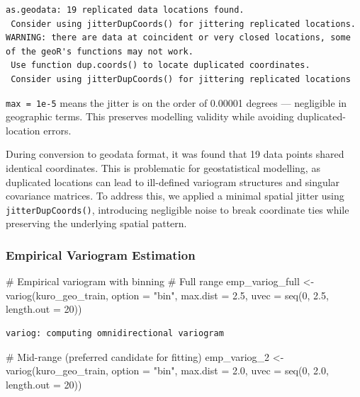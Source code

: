 \documentclass[
  11pt,
]{article}
\newenvironment{Shaded}{\begin{snugshade}}{\end{snugshade}}
\newcommand{\AttributeTok}[1]{\textcolor[rgb]{0.40,0.45,0.13}{#1}}
\newcommand{\CommentTok}[1]{\textcolor[rgb]{0.37,0.37,0.37}{#1}}
\newcommand{\DecValTok}[1]{\textcolor[rgb]{0.68,0.00,0.00}{#1}}
\newcommand{\FloatTok}[1]{\textcolor[rgb]{0.68,0.00,0.00}{#1}}
\newcommand{\FunctionTok}[1]{\textcolor[rgb]{0.28,0.35,0.67}{#1}}
\newcommand{\NormalTok}[1]{\textcolor[rgb]{0.00,0.23,0.31}{#1}}
\newcommand{\OtherTok}[1]{\textcolor[rgb]{0.00,0.23,0.31}{#1}}
\newcommand{\StringTok}[1]{\textcolor[rgb]{0.13,0.47,0.30}{#1}}
\begin{document}
\begin{verbatim}
as.geodata: 19 replicated data locations found. 
 Consider using jitterDupCoords() for jittering replicated locations. 
WARNING: there are data at coincident or very closed locations, some of the geoR's functions may not work.
 Use function dup.coords() to locate duplicated coordinates.
 Consider using jitterDupCoords() for jittering replicated locations 
\end{verbatim}

\texttt{max\ =\ 1e-5} means the jitter is on the order of 0.00001
degrees --- negligible in geographic terms. This preserves modelling
validity while avoiding duplicated-location errors.

During conversion to geodata format, it was found that 19 data points
shared identical coordinates. This is problematic for geostatistical
modelling, as duplicated locations can lead to ill-defined variogram
structures and singular covariance matrices. To address this, we applied
a minimal spatial jitter using \texttt{jitterDupCoords()}, introducing
negligible noise to break coordinate ties while preserving the
underlying spatial pattern.

\subsubsection{Empirical Variogram
Estimation}\label{empirical-variogram-estimation}

\begin{Shaded}
\begin{Highlighting}[]
\CommentTok{\# Empirical variogram with binning}
\CommentTok{\# Full range}
\NormalTok{emp\_variog\_full }\OtherTok{\textless{}{-}} \FunctionTok{variog}\NormalTok{(kuro\_geo\_train, }\AttributeTok{option =} \StringTok{"bin"}\NormalTok{, }\AttributeTok{max.dist =} \FloatTok{2.5}\NormalTok{, }\AttributeTok{uvec =} \FunctionTok{seq}\NormalTok{(}\DecValTok{0}\NormalTok{, }\FloatTok{2.5}\NormalTok{, }\AttributeTok{length.out =} \DecValTok{20}\NormalTok{))}
\end{Highlighting}
\end{Shaded}

\begin{verbatim}
variog: computing omnidirectional variogram
\end{verbatim}

\begin{Shaded}
\begin{Highlighting}[]
\CommentTok{\# Mid{-}range (preferred candidate for fitting)}
\NormalTok{emp\_variog\_2 }\OtherTok{\textless{}{-}} \FunctionTok{variog}\NormalTok{(kuro\_geo\_train, }\AttributeTok{option =} \StringTok{"bin"}\NormalTok{, }\AttributeTok{max.dist =} \FloatTok{2.0}\NormalTok{, }\AttributeTok{uvec =} \FunctionTok{seq}\NormalTok{(}\DecValTok{0}\NormalTok{, }\FloatTok{2.0}\NormalTok{, }\AttributeTok{length.out =} \DecValTok{20}\NormalTok{))}
\end{Highlighting}
\end{Shaded}
\end{document}
